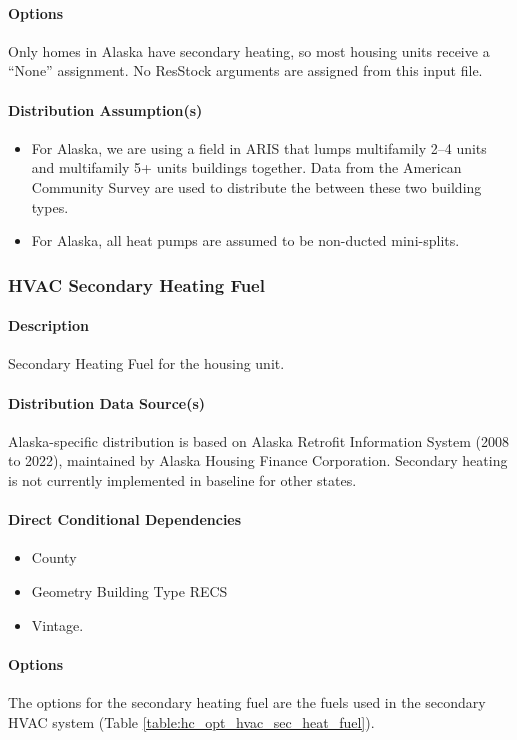 \paragraph{Options}
Only homes in Alaska have secondary heating, so most housing units receive a ``None'' assignment. No ResStock arguments are assigned from this input file. 

\paragraph{Distribution Assumption(s)}
\begin{itemize}
    \item For Alaska, we are using a field in ARIS that lumps multifamily 2--4 units and multifamily 5+ units buildings together. Data from the American Community Survey are used to distribute the between these two building types.
    \item For Alaska, all heat pumps are assumed to be non-ducted mini-splits.
\end{itemize}

\subsubsection{HVAC Secondary Heating Fuel}
\paragraph{Description}
Secondary Heating Fuel for the housing unit. 
\paragraph{Distribution Data Source(s)}
Alaska-specific distribution is based on Alaska Retrofit Information System (2008 to 2022), maintained by Alaska Housing Finance Corporation. Secondary heating is not currently implemented in baseline for other states.
\paragraph{Direct Conditional Dependencies}
\begin{itemize}
    \item County
    \item Geometry Building Type RECS
    \item Vintage.
\end{itemize}
\paragraph{Options}
The options for the secondary heating fuel are the fuels used in the secondary HVAC system (Table \ref{table:hc_opt_hvac_sec_heat_fuel}).


